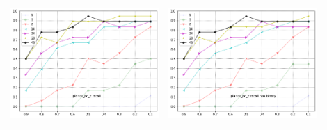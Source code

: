 \documentclass{article}
\begin{document}
\begin{table}[h!]
\begin{tabular}{p{0.45\linewidth}p{0.45\linewidth}}
            \includegraphics[width=\linewidth]{pnz} & \includegraphics[width=\linewidth]{pnz_non_binary}\\ 

\end{tabular}
\end{table}
\end{document}
